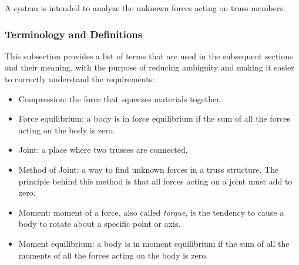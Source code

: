 \documentclass[12pt]{article}
\begin{document}
A system is intended to analyze the unknown forces acting on truss members.

\subsubsection{Terminology and  Definitions}

This subsection provides a list of terms that are used in the subsequent
sections and their meaning, with the purpose of reducing ambiguity and making it
easier to correctly understand the requirements:

\begin{itemize}
	
	\item Compression: the force that squeezes materials together.
	
\end{itemize}

\begin{itemize}
	
	\item Force equilibrium: a body is in force equilibrium if the sum of all 
	the forces acting on the body is zero. 
	
\end{itemize}

\begin{itemize}
	
	\item Joint: a place where two trusses are connected.
	
\end{itemize}

\begin{itemize}
	
	\item Method of Joint: a way to find unknown forces in a truss structure. 
	The principle behind this method is that all forces acting on a joint must 
	add to zero.
	
\end{itemize}

\begin{itemize}
	
	\item Moment: moment of a force, also called \textit{torque}, is the 
	tendency to cause a body to rotate about a 	specific point or axis. 
	
\end{itemize}

\begin{itemize}
	
	\item Moment equilibrium: a body is in moment equilibrium if the sum of all 
	the moments of all the forces acting on the body is zero.
	
\end{itemize}
\end{document}
